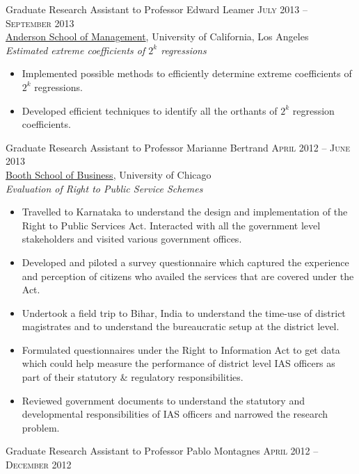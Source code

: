 \documentclass[11pt]{article}
\begin{document}
Graduate Research Assistant to Professor Edward Leamer \hfill
\textsc{\normalsize July 2013 -- September 2013}\\
\href{http://www.anderson.ucla.edu/faculty/global-economics-and-management/phd-program}{Anderson School of Management}, University of California, Los Angeles \\
\emph{Estimated extreme coefficients of $2^k$ regressions}
\begin{itemize}
\item Implemented possible methods to efficiently determine extreme coefficients of $2^k$ regressions.
\item Developed efficient techniques to identify all the orthants of $2^k$ regression coefficients.
\end{itemize}
\vspace{0.5em}
Graduate Research Assistant to Professor Marianne Bertrand \hfill
\textsc{\normalsize April 2012 -- June 2013}\\
\href{http://www.chicagobooth.edu/faculty/bio.aspx?person_id%3D12824551424}{Booth School of Business}, University of Chicago \\
\emph{Evaluation of Right to Public Service Schemes}
\begin{itemize}
\item Travelled to Karnataka to understand the design and implementation of the Right to Public Services Act. Interacted with all the government level stakeholders and visited various government offices.
\item Developed and piloted a survey questionnaire which captured the experience and perception of citizens who availed the services that are covered under the Act.
\item Undertook a field trip to Bihar, India to understand the time-use of district magistrates and to understand the bureaucratic setup at the district level.
\item Formulated questionnaires under the Right to Information Act to get data which could help measure the performance of district level IAS officers as part of their statutory \& regulatory responsibilities.
\item Reviewed government documents to understand the statutory and
  developmental responsibilities of IAS officers and narrowed the
  research problem.
\end{itemize}
\vspace{0.5em}
Graduate Research Assistant to Professor Pablo Montagnes \hfill
\textsc{April 2012 -- December 2012}\\
\end{document}
